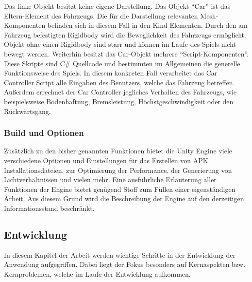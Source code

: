 Das linke Objekt besitzt keine eigene Darstellung. Das Objekt \enquote{Car} ist das Eltern-Element des Fahrzeugs. Die für die Darstellung relevanten Mesh-Komponenten befinden sich in diesem Fall in den Kind-Elementen. Durch den am Fahrzeug befestigten Rigidbody wird die Beweglichkeit des Fahrzeugs ermöglicht. Objekt ohne einen Rigidbody sind starr und können im Laufe des Spiels nicht bewegt werden.
Weiterhin besitzt das Car-Objekt mehrere \enquote{Script-Komponenten}. Diese Skripte sind C\# Quellcode und bestimmten im Allgemeinen die generelle Funktionsweise des Spiels. In diesem konkreten Fall verarbeitet das Car Controller Script alle Eingaben des Benutzers, welche das Fahrzeug betreffen. Außerdem errechnet der Car Controller jegliches Verhalten des Fahrzeugs, wie beispielsweise Bodenhaftung, Bremsleistung, Höchstgeschwindigkeit oder den Rückwärtsgang.

\subsubsection{Build und Optionen}
Zusätzlich zu den bisher genannten Funktionen bietet die Unity Engine viele verschiedene Optionen und Einstellungen für das Erstellen von APK Installationsdateien, zur Optimierung der Performance, der Generierung von Lichtverhältnissen und vielen mehr. Eine ausführliche Erläuterung aller Funktionen der Engine bietet genügend Stoff zum Füllen einer eigenständigen Arbeit. Aus diesem Grund wird die Beschreibung der Engine auf den derzeitigen Informationsstand beschränkt.

\subsection{Entwicklung}
In diesem Kapitel der Arbeit werden wichtige Schritte in der Entwicklung der Anwendung aufgegriffen. Dabei liegt der Fokus besonders auf Kernaspekten bzw. Kernproblemen, welche im Laufe der Entwicklung aufkommen.
